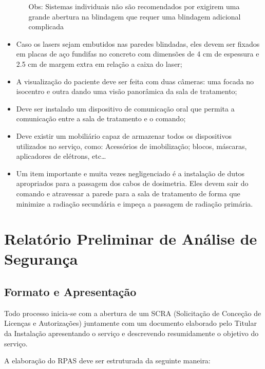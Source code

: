 \documentclass[11pt,a4paper]{article}
\begin{document}
\begin{itemize}
\begin{itemize}
                    Obs: Sistemas individuais não são recomendados por exigirem uma grande abertura na blindagem que requer uma blindagem adicional complicada
                \end{itemize}
            \item Caso os lasers sejam embutidos nas paredes blindadas, eles devem ser fixados em placas de aço fundifas no concreto com dimensões de 4 cm de espessura e 2.5 cm de margem extra em relação a caixa do laser;
            \item A visualização do paciente deve ser feita com duas câmeras: uma focada no isocentro e outra dando uma visão panorâmica da sala de tratamento;
            \item Deve ser instalado um dispositivo de comunicação oral que permita a comunicação entre a sala de tratamento e o comando;
            \item Deve existir um mobiliário capaz de armazenar todos os dispositivos utilizados no serviço, como: Acessórios de imobilização; blocos, máscaras, aplicadores de elétrons, etc\dots
            \item Um item importante e muita vezes negligenciado é a instalação de dutos apropriados para a passagem dos cabos de dosimetria. Eles devem sair do comando e atravessar a parede para a sala de tratamento de forma que minimize a radiação secundária e impeça a passagem de radiação primária.
        \end{itemize}

    
    \section{Relatório Preliminar de Análise de Segurança}

        \subsection{Formato e Apresentação}

            Todo processo inicia-se com a abertura de um SCRA (Solicitação de Conceção de Licenças e Autorizações) juntamente com um documento elaborado pelo Titular da Instalação apresentando o serviço e descrevendo resumidamente o objetivo do serviço.

            A elaboração do RPAS deve ser estruturada da seguinte maneira:
\end{document}
